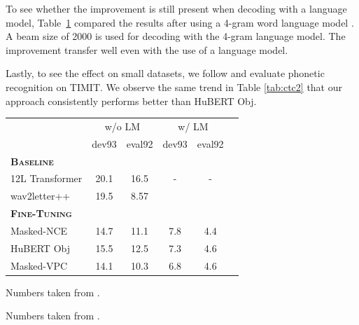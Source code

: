 \documentclass[11pt,a4paper]{article}
\begin{document}
To see whether the improvement is still present when decoding with a language model, Table~\ref{tab:ctc-lm} compared the results after using a 4-gram word language model \citep{heafield2013scalable}.
A beam size of 2000 is used for decoding with the 4-gram language model.
The improvement transfer well even with the use of a language model.

Lastly, to see the effect on small datasets, we follow \citet{baevski2020wav2vec} and evaluate phonetic recognition on TIMIT.
%
%
%
%
%
%
We observe the same trend in Table \ref{tab:ctc2} that our approach consistently performs better than HuBERT Obj.

\begin{table}[t]
\centering
{}
\label{tab:ctc-lm}
\begin{threeparttable}
\footnotesize
\begin{tabularx}{0.97\linewidth}{lccccc}
  \toprule
                                & \multicolumn{2}{c}{w/o LM} &\multicolumn{2}{c}{w/ LM} \\
                                & dev93 & eval92  &dev93 &eval92 \\
  \midrule
  \textbf{\textsc{Baseline}} &&&&\\[1pt]
    12L Transformer\tnote{\ddag} &20.1 &16.5 &- &-\\
    wav2letter++ \tnote{\dag}     &19.5     &8.57 &&\\
  \midrule
  \multicolumn{3}{l}{\textbf{\textsc{Fine-Tuning}}} &\\[1pt]
    Masked-NCE                     &14.7 &11.1  &7.8 &4.4 \\
    HuBERT Obj                     &15.5  &12.5 &7.3  &4.6\\
    Masked-VPC                     &14.1  &10.3 &6.8  &4.6\\
  \bottomrule
\end{tabularx}
\begin{tablenotes}\footnotesize
\item[\ddag] Numbers taken from \citet{lee2021intermediate}.
\item[\dag] Numbers taken from \citet{baevski2019vq}.
\end{tablenotes}
\end{threeparttable}
\end{table}
\end{document}
